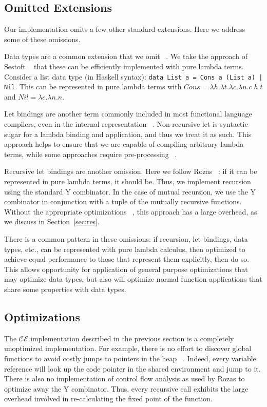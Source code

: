 \subsection{Omitted Extensions}

Our implementation omits a few other standard extensions. Here we address some
of these omissions.

Data types are a common extension that we omit ~\cite{jonesstg,boquist1997grin}.
We take the approach of Sestoft ~\cite{sestoft} that these can be efficiently
implemented with pure lambda terms. Consider a list data type (in Haskell
syntax): \texttt{data List a = Cons a (List a) | Nil}. This can be represented
in pure lambda terms with $Cons = \lambda h.\lambda t.\lambda c.\lambda n.c \; h
\; t$ and $Nil = \lambda c.\lambda n.n$. 

Let bindings are another term commonly included in most functional language
compilers, even in the internal representation ~\cite{boquist1997grin,jonesstg}.
Non-recursive let is syntactic sugar for a lambda binding and application, and
thus we treat it as such. This approach helps to ensure that we are capable of
compiling arbitrary lambda terms, while some approaches require pre-processing
~\cite{sestoft,TIM}.

Recursive let bindings are another omission. Here we follow Rozas
~\cite{rozas1992taming}: if it can be represented in pure lambda terms, it should
be. Thus, we implement recursion using the standard Y combinator. In the case of
mutual recursion, we use the Y combinator in conjunction with a tuple of the
mutually recursive functions. Without the appropriate
optimizations ~\cite{rozas1992taming}, this approach has a large overhead, as we
discuss in Section~\ref{sec:res}.

There is a common pattern in these omissions: if recursion, let bindings, data
types, etc., can be represented with pure lambda calculus, then optimized to
achieve equal performance to those that represent them explicitly, then do so.
This allows opportunity for application of general purpose optimizations that
may optimize data types, but also will optimize normal function applications
that share some properties with data types.

\subsection{Optimizations}

The $\mathcal{CE}$ implementation described in the previous section is a
completely unoptimized implementation. For example, there is no effort to
discover global functions to avoid costly jumps to pointers in the heap
~\cite{jonesstg}. Indeed, every variable reference will look up the code pointer
in the shared environment and jump to it. There is also no implementation of 
control flow analysis as used by Rozas to optimize away the Y combinator.  Thus,
every recursive call exhibits the large overhead involved in re-calculating the
fixed point of the function.  

